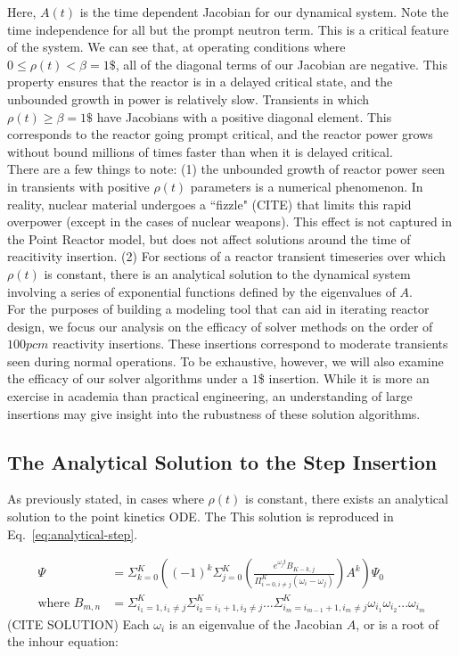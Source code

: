 \documentclass[review,onefignum,onetabnum]{siamart171218}
\begin{document}
Here, $A(t)$ is the time dependent Jacobian for our dynamical system. Note the
time independence for all but the prompt neutron term. This is a critical feature
of the system. We can see that, at operating conditions where $0 \leq \rho(t) < \beta = 1\$$,
all of the diagonal terms of our Jacobian are negative. This property ensures
that the reactor is in a delayed critical state, and the unbounded growth in power
is relatively slow. Transients in which $\rho(t) \geq \beta = 1\$$ have Jacobians with
a positive diagonal element. This corresponds to the reactor going prompt critical, and
the reactor power grows without bound millions of times faster than when it is delayed
critical. \\

There are a few things to note: (1) the unbounded growth of reactor power seen
in transients with positive $\rho(t)$ parameters is a numerical phenomenon. In reality,
nuclear material undergoes a ``fizzle" (CITE) that limits this rapid overpower (except
in the cases of nuclear weapons). This effect is not captured in the Point Reactor
model, but does not affect solutions around the time of reacitivity insertion. (2) For
sections of a reactor transient timeseries over which $\rho(t)$ is constant, there is an
analytical solution to the dynamical system involving a series of exponential functions
defined by the eigenvalues of $A$. \\

For the purposes of building a modeling tool that can aid in iterating reactor design,
we focus our analysis on the efficacy of solver methods on the order of $100 pcm$
reactivity insertions. These insertions correspond to moderate transients seen during
normal operations. To be exhaustive, however, we will also examine the efficacy of our
solver algorithms under a $1$\$ insertion. While it is more an exercise in academia than
practical engineering, an understanding of large insertions may give insight into the
rubustness of these solution  algorithms.

\subsection{The Analytical Solution to the Step Insertion}
As previously stated, in cases where $\rho(t)$ is constant, there exists an
analytical solution to the point kinetics ODE. The  This solution is reproduced in
Eq.~\cref{eq:analytical-step}.

\begin{align}
  \label{eq:analytical-step}
  \Psi &= \Sigma_{k=0}^K \left( (-1)^k \Sigma_{j=0}^K \left( \frac{e^{\omega_jt}B_{K-k,j}}{\Pi_{i=0, i\neq j}^K (\omega_i - \omega_j)}\right) A^k\right)\Psi_0\\
  \text{where } B_{m,n} &= \Sigma_{i_1 = 1, i_1 \neq j}^K \Sigma_{i_2 = i_1 + 1, i_2 \neq j}^K ...\Sigma_{i_m = i_{m-1} + 1, i_m \neq j}^K \omega_{i_1}\omega_{i_2}...\omega_{i_m}
\end{align}
(CITE SOLUTION)
Each $\omega_i$ is an eigenvalue of the Jacobian $A$, or is a root of the inhour
equation:
\end{document}

